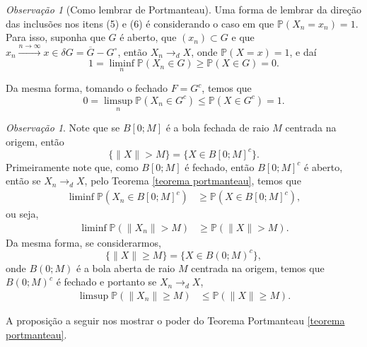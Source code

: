 \documentclass[12pt,a4paper,oneside]{book}
\theoremstyle{definition}
\theoremstyle{remark}
\newtheorem{remark}[theorem]{Observa\c{c}\~ao}
\numberwithin{equation}{section}
\newcommand{\pr}{\mathbb{P}}
\newcommand{\rarrowlimn}{\xrightarrow{n\rightarrow \infty}}
\begin{document}
\begin{tcolorbox}[colback = yellow!60]
\begin{remark}[Como lembrar de Portmanteau] Uma forma de lembrar da direção das inclusões nos itens (5) e (6) é considerando o caso em que $\pr(X_n = x_n) = 1$. Para isso, suponha que $G$ é aberto, que $(x_n)\subset G$ e que $x_n\rarrowlimn x\in \delta G = \overline{G} -  G^\circ$, então $X_n \rightarrow_d X$, onde $\pr(X=x)=1$, e daí
$$1 = \liminf_n \pr(X_n\in G)\geq \pr(X\in G) = 0. $$

Da mesma forma, tomando o fechado $F= G^c$, temos que
$$0 = \limsup_n \pr(X_n\in G^c)\leq \pr(X\in G^c) = 1. $$
\end{remark}
\end{tcolorbox}



\begin{tcolorbox}[colback = yellow!60]
\begin{remark}\label{obs-portmanteu-tight}
Note que se $B[0;M]$ é a bola fechada de raio $M$ centrada na origem, então
$$\{\|X\|>M\} = \{X\in B[0;M]^c\}. $$
Primeiramente note que, como $B[0;M]$ é fechado, então $B[0;M]^c$ é aberto, então se $X_n \rightarrow_d X$, pelo Teorema \ref{teorema portmanteau}, temos que
\begin{align*}
 \liminf \pr(X_n\in B[0;M]^c)&\geq \pr(X\in B[0;M]^c), 
\end{align*}
ou seja,
\begin{align*}
 \liminf \pr(\|X_n\|>M)&\geq \pr(\|X\|>M).
\end{align*}
Da mesma forma, se considerarmos,
$$\{\|X\|\geq M\} = \{X\in B(0;M)^c\}, $$
onde $B(0;M)$ é a bola aberta de raio $M$ centrada na origem, temos que $B(0;M)^c$ é fechado e portanto se $X_n \rightarrow_d X$,
\begin{align*}
 \limsup \pr(\|X_n\|\geq M)&\leq \pr(\|X\|\geq M).
\end{align*}
\end{remark}
\end{tcolorbox}

A proposição a seguir nos mostrar o poder do Teorema Portmanteau \ref{teorema portmanteau}.
\end{document}
